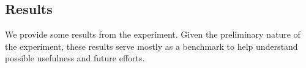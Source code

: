 \subsection{Results}

We provide some results from the experiment. Given the preliminary nature
of the experiment, these results serve mostly as a benchmark to help
understand possible usefulness and future efforts.